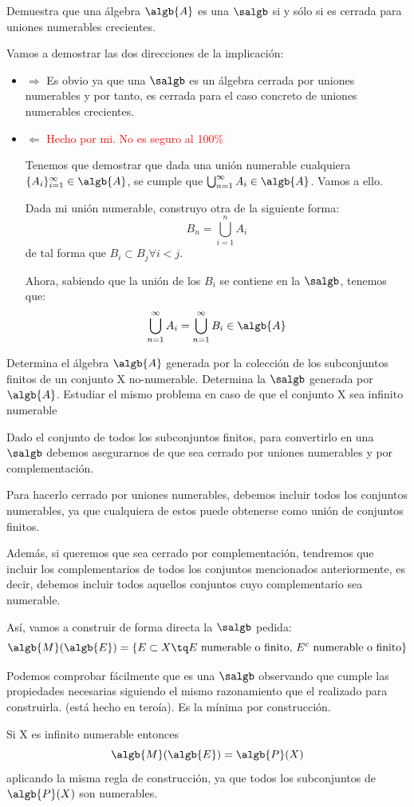 \begin{problem}[6]
Demuestra que una álgebra $\algb{A}$ es una $\salgb$ si y sólo si es cerrada para uniones numerables crecientes.

\solution
Vamos a demostrar las dos direcciones de la implicación:
\begin{itemize}
\item $\Rightarrow$
Es obvio ya que una $\salgb$ es un álgebra cerrada por uniones numerables y por tanto, es cerrada para el caso concreto de uniones numerables crecientes.
\item $\Leftarrow$
\textcolor{red}{Hecho por mi. No es seguro al 100\%}

Tenemos que demostrar que dada una unión numerable cualquiera $\{A_i\}_{i=1}^{\infty} \in \algb{A}$, se cumple que $\bigcup_{n=1}^{\infty} A_i \in \algb{A}$. Vamos a ello.

Dada mi unión numerable, construyo otra de la siguiente forma:
\[B_n = \bigcup_{i=1}^{n} A_i\]
de tal forma que $B_i \subset B_j \forall i<j$.

Ahora, sabiendo que la unión de los $B_i$ se contiene en la $\salgb$, tenemos que:
\[\bigcup_{n=1}^{\infty} A_i=\bigcup_{n=1}^{\infty} B_i \in \algb{A}\]

\end{itemize}
\end{problem}

\begin{problem}[7]
Determina el álgebra $\algb{A}$ generada por la colección de los subconjuntos finitos de un conjunto X no-numerable. Determina la $\salgb$ generada por $\algb{A}$. Estudiar el mismo problema en caso de que el conjunto X sea infinito numerable

\solution
Dado el conjunto de todos los subconjuntos finitos, para convertirlo en una $\salgb$ debemos asegurarnos de que sea cerrado por uniones numerables y por complementación.

Para hacerlo cerrado por uniones numerables, debemos incluir todos los conjuntos numerables, ya que cualquiera de estos puede obtenerse como unión de conjuntos finitos.

Además, si queremos que sea cerrado por complementación, tendremos que incluir los complementarios de todos los conjuntos mencionados anteriormente, es decir, debemos incluir todos aquellos conjuntos cuyo complementario sea numerable.

Así, vamos a construir de forma directa la $\salgb$ pedida:
\[\algb{M}(\algb{E})=\{ E\subset X \tq E \text{ numerable o finito, } E^c \text{ numerable o finito}\}\]

Podemos comprobar fácilmente que es una $\salgb$ observando que cumple las propiedades necesarias siguiendo el mismo razonamiento que el realizado para construirla. (está hecho en teroía). Es la mínima por construcción.

Si X es infinito numerable entonces 
\[\algb{M}(\algb{E})=\algb{P}(X)\]
aplicando la misma regla de construcción, ya que todos los subconjuntos de $\algb{P}(X)$ son numerables.
\end{problem}

